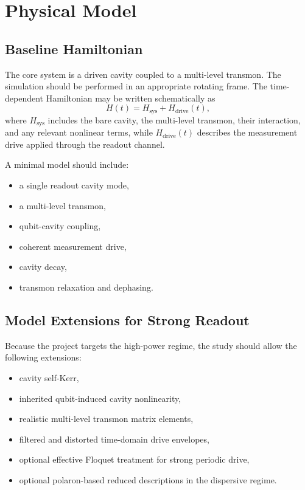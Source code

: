 \documentclass[11pt]{article}
\begin{document}
\section{Physical Model}

\subsection{Baseline Hamiltonian}

The core system is a driven cavity coupled to a multi-level transmon. The simulation should
be performed in an appropriate rotating frame. The time-dependent Hamiltonian may be written
schematically as
\begin{equation}
    H(t) = H_{\mathrm{sys}} + H_{\mathrm{drive}}(t),
\end{equation}
where $H_{\mathrm{sys}}$ includes the bare cavity, the multi-level transmon, their
interaction, and any relevant nonlinear terms, while $H_{\mathrm{drive}}(t)$ describes the
measurement drive applied through the readout channel.

A minimal model should include:
\begin{itemize}[leftmargin=2em]
    \item a single readout cavity mode,
    \item a multi-level transmon,
    \item qubit-cavity coupling,
    \item coherent measurement drive,
    \item cavity decay,
    \item transmon relaxation and dephasing.
\end{itemize}

\subsection{Model Extensions for Strong Readout}

Because the project targets the high-power regime, the study should allow the following
extensions:
\begin{itemize}[leftmargin=2em]
    \item cavity self-Kerr,
    \item inherited qubit-induced cavity nonlinearity,
    \item realistic multi-level transmon matrix elements,
    \item filtered and distorted time-domain drive envelopes,
    \item optional effective Floquet treatment for strong periodic drive,
    \item optional polaron-based reduced descriptions in the dispersive regime.
\end{itemize}
\end{document}
